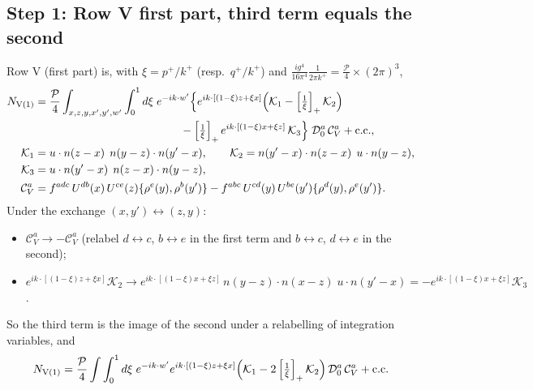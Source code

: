 \documentclass[10pt]{article}
\numberwithin{equation}{section}
\begin{document}
\subsection{Step 1: Row V first part, third term equals the second}
Row V (first part) is, with $\xi=p^{+}/k^{+}$ (resp.\ $q^{+}/k^{+}$) and $\frac{ig^{4}}{16\pi^{4}}\frac{1}{2\pi k^{+}}=\frac{\mathcal{P}}{4}\times(2\pi)^{3}$,
\begin{align}
N_{\rm V(1)}&=\frac{\mathcal{P}}{4}\int_{x,z,y,x',y',w'}\int_{0}^{1}d\xi\;e^{-ik\cdot w'}\Big\{e^{ik\cdot[(1-\xi)z+\xi x]}\Big(\mathcal{K}_{1}-\left[\tfrac1\xi\right]_{+}\mathcal{K}_{2}\Big)\notag\\
&\hspace{4.6cm}-\left[\tfrac1\xi\right]_{+}e^{ik\cdot[(1-\xi)x+\xi z]}\,\mathcal{K}_{3}\Big\}\;\mathcal{D}_{0}^{a}\,\mathcal{C}_{V}^{a}+{\rm c.c.},\notag\\
\mathcal{K}_{1}&=u\cdot n(z-x)\;\,n(y-z)\cdot n(y'-x),\qquad
\mathcal{K}_{2}=n(y'-x)\cdot n(z-x)\;\,u\cdot n(y-z),\notag\\
\mathcal{K}_{3}&=u\cdot n(y'-x)\;\,n(z-x)\cdot n(y-z),\notag\\
\mathcal{C}_{V}^{a}&=f^{adc}\,U^{db}(x)\,U^{ce}(z)\{\rho^{e}(y),\rho^{b}(y')\}-f^{abc}\,U^{cd}(y)\,U^{be}(y')\{\rho^{d}(y),\rho^{e}(y')\}.
\end{align}
Under the exchange $(x,y')\leftrightarrow(z,y)$:
\begin{itemize}
\item $\mathcal{C}_{V}^{a}\to-\mathcal{C}_{V}^{a}$ (relabel $d\leftrightarrow c$, $b\leftrightarrow e$ in the first term and $b\leftrightarrow c$, $d\leftrightarrow e$ in the second);
\item $e^{ik\cdot[(1-\xi)z+\xi x]}\mathcal{K}_{2}\to e^{ik\cdot[(1-\xi)x+\xi z]}\,n(y-z)\cdot n(x-z)\;u\cdot n(y'-x)=-e^{ik\cdot[(1-\xi)x+\xi z]}\mathcal{K}_{3}$.
\end{itemize}
So the third term is the image of the second under a relabelling of integration variables, and
\begin{align}
N_{\rm V(1)}=\frac{\mathcal{P}}{4}\int\int_{0}^{1}d\xi\;e^{-ik\cdot w'}e^{ik\cdot[(1-\xi)z+\xi x]}\Big(\mathcal{K}_{1}-2\left[\tfrac1\xi\right]_{+}\mathcal{K}_{2}\Big)\,\mathcal{D}_{0}^{a}\,\mathcal{C}_{V}^{a}+{\rm c.c.} \label{eq:V1}
\end{align}
\end{document}

